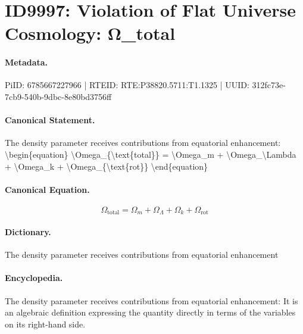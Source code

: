 \section*{ID9997: Violation of Flat Universe Cosmology: Ω\_total}
\paragraph{Metadata.}
PiID: 6785667227966 | RTEID: RTE:P38820.5711:T1.1325 | UUID: 312fc73e-7cb9-540b-9dbc-8e80bd3756ff

\paragraph{Canonical Statement.}
The density parameter receives contributions from equatorial enhancement: \textbackslash{}begin\{equation\} \textbackslash{}Omega\_\{\textbackslash{}text\{total\}\} = \textbackslash{}Omega\_m + \textbackslash{}Omega\_\textbackslash{}Lambda + \textbackslash{}Omega\_k + \textbackslash{}Omega\_\{\textbackslash{}text\{rot\}\} \textbackslash{}end\{equation\}

\paragraph{Canonical Equation.}
\[
\Omega_{\text{total}} = \Omega_m + \Omega_\Lambda + \Omega_k + \Omega_{\text{rot}}
\]

\paragraph{Dictionary.}
The density parameter receives contributions from equatorial enhancement

\paragraph{Encyclopedia.}
The density parameter receives contributions from equatorial enhancement: It is an algebraic definition expressing the quantity directly in terms of the variables on its right-hand side.
